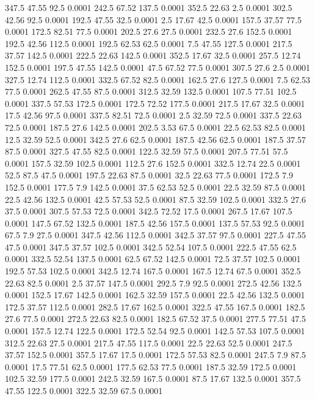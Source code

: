 347.5	47.55	92.5	0.0001
242.5	67.52	137.5	0.0001
352.5	22.63	2.5	0.0001
302.5	42.56	92.5	0.0001
192.5	47.55	32.5	0.0001
2.5	17.67	42.5	0.0001
157.5	37.57	77.5	0.0001
172.5	82.51	77.5	0.0001
202.5	27.6	27.5	0.0001
232.5	27.6	152.5	0.0001
192.5	42.56	112.5	0.0001
192.5	62.53	62.5	0.0001
7.5	47.55	127.5	0.0001
217.5	37.57	142.5	0.0001
222.5	22.63	142.5	0.0001
352.5	17.67	32.5	0.0001
257.5	12.74	152.5	0.0001
197.5	47.55	142.5	0.0001
47.5	67.52	77.5	0.0001
307.5	27.6	2.5	0.0001
327.5	12.74	112.5	0.0001
332.5	67.52	82.5	0.0001
162.5	27.6	127.5	0.0001
7.5	62.53	77.5	0.0001
262.5	47.55	87.5	0.0001
312.5	32.59	132.5	0.0001
107.5	77.51	102.5	0.0001
337.5	57.53	172.5	0.0001
172.5	72.52	177.5	0.0001
217.5	17.67	32.5	0.0001
17.5	42.56	97.5	0.0001
337.5	82.51	72.5	0.0001
2.5	32.59	72.5	0.0001
337.5	22.63	72.5	0.0001
187.5	27.6	142.5	0.0001
202.5	3.53	67.5	0.0001
22.5	62.53	82.5	0.0001
12.5	32.59	52.5	0.0001
342.5	27.6	62.5	0.0001
187.5	42.56	62.5	0.0001
187.5	37.57	87.5	0.0001
327.5	47.55	82.5	0.0001
122.5	32.59	57.5	0.0001
207.5	77.51	57.5	0.0001
157.5	32.59	102.5	0.0001
112.5	27.6	152.5	0.0001
332.5	12.74	22.5	0.0001
52.5	87.5	47.5	0.0001
197.5	22.63	87.5	0.0001
32.5	22.63	77.5	0.0001
172.5	7.9	152.5	0.0001
177.5	7.9	142.5	0.0001
37.5	62.53	52.5	0.0001
22.5	32.59	87.5	0.0001
22.5	42.56	132.5	0.0001
42.5	57.53	52.5	0.0001
87.5	32.59	102.5	0.0001
332.5	27.6	37.5	0.0001
307.5	57.53	72.5	0.0001
342.5	72.52	17.5	0.0001
267.5	17.67	107.5	0.0001
147.5	67.52	132.5	0.0001
187.5	42.56	157.5	0.0001
137.5	57.53	92.5	0.0001
67.5	7.9	27.5	0.0001
347.5	42.56	112.5	0.0001
342.5	37.57	97.5	0.0001
227.5	47.55	47.5	0.0001
347.5	37.57	102.5	0.0001
342.5	52.54	107.5	0.0001
222.5	47.55	62.5	0.0001
332.5	52.54	137.5	0.0001
62.5	67.52	142.5	0.0001
72.5	37.57	102.5	0.0001
192.5	57.53	102.5	0.0001
342.5	12.74	167.5	0.0001
167.5	12.74	67.5	0.0001
352.5	22.63	82.5	0.0001
2.5	37.57	147.5	0.0001
292.5	7.9	92.5	0.0001
272.5	42.56	132.5	0.0001
152.5	17.67	142.5	0.0001
162.5	32.59	157.5	0.0001
22.5	42.56	132.5	0.0001
172.5	37.57	112.5	0.0001
282.5	17.67	162.5	0.0001
322.5	47.55	167.5	0.0001
182.5	27.6	77.5	0.0001
272.5	22.63	82.5	0.0001
182.5	67.52	37.5	0.0001
277.5	77.51	47.5	0.0001
157.5	12.74	122.5	0.0001
172.5	52.54	92.5	0.0001
142.5	57.53	107.5	0.0001
312.5	22.63	27.5	0.0001
217.5	47.55	117.5	0.0001
22.5	22.63	52.5	0.0001
247.5	37.57	152.5	0.0001
357.5	17.67	17.5	0.0001
172.5	57.53	82.5	0.0001
247.5	7.9	87.5	0.0001
17.5	77.51	62.5	0.0001
177.5	62.53	77.5	0.0001
187.5	32.59	172.5	0.0001
102.5	32.59	177.5	0.0001
242.5	32.59	167.5	0.0001
87.5	17.67	132.5	0.0001
357.5	47.55	122.5	0.0001
322.5	32.59	67.5	0.0001
